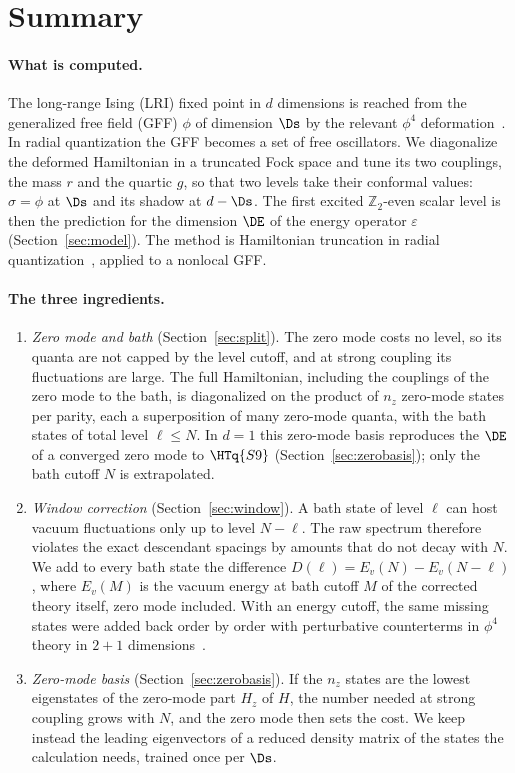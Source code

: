 \section{Summary}\label{sec:summary}

\paragraph{What is computed.} The long-range Ising (LRI) fixed point in $d$ dimensions is reached from the generalized
free field (GFF) $\phi$ of dimension $\Ds$ by the relevant $\phi^4$
deformation~\cite{Fisher:1972zz,Sak:1973oqx,Paulos:2015jfa,Behan:2017emf}. In radial quantization the GFF
becomes a set of free oscillators. We diagonalize the deformed Hamiltonian in a truncated Fock space and tune its two
couplings, the mass $r$ and the quartic $g$, so that two levels take their conformal values: $\sigma=\phi$ at $\Ds$
and its shadow at $d-\Ds$. The first excited $\mathbb Z_2$-even scalar level is then the prediction for the
dimension $\DE$ of the energy operator $\varepsilon$ (Section~\ref{sec:model}). The method is Hamiltonian truncation
in radial quantization~\cite{Hogervorst:2014rta,Rychkov:2014eea}, applied to a nonlocal GFF.

\paragraph{The three ingredients.}
\begin{enumerate}
\item \emph{Zero mode and bath} (Section~\ref{sec:split}). The zero mode costs no level, so its quanta are not capped
 by the level cutoff, and at strong coupling its fluctuations are large. The full Hamiltonian, including the
 couplings of the zero mode to the bath, is diagonalized on the product of $n_z$ zero-mode states per parity, each a
 superposition of many zero-mode quanta, with the bath states of total level $\ell\le N$. In $d=1$ this zero-mode
 basis reproduces the $\DE$ of a converged zero mode to $\HTq{S9}$ (Section~\ref{sec:zerobasis}); only the bath
 cutoff $N$ is extrapolated.
\item \emph{Window correction} (Section~\ref{sec:window}). A bath state of level $\ell$ can host vacuum fluctuations
 only up to level $N-\ell$. The raw spectrum therefore violates the exact descendant spacings by amounts that do not
 decay with $N$. We add to every bath state the difference $D(\ell)=E_v(N)-E_v(N-\ell)$, where $E_v(M)$ is the
 vacuum energy at bath cutoff $M$ of the corrected theory itself, zero mode included. With an energy cutoff, the
 same missing states were added back order by order with perturbative counterterms in $\phi^4$ theory in $2+1$
 dimensions~\cite{Elias-Miro:2020qwz}.
\item \emph{Zero-mode basis} (Section~\ref{sec:zerobasis}). If the $n_z$ states are the lowest eigenstates of the
 zero-mode part $H_z$ of $H$, the number needed at strong coupling grows with $N$, and the zero mode then sets the
 cost. We keep instead the leading eigenvectors of a reduced density matrix of the states the calculation needs,
 trained once per $\Ds$.
\end{enumerate}

